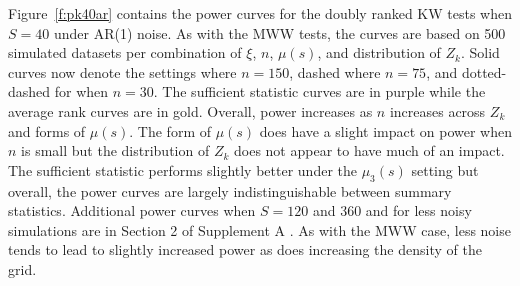 \documentclass[12pt]{article}
\theoremstyle{plain}
\theoremstyle{remark}
\begin{document}
Figure~\ref{f:pk40ar} contains the power curves for the doubly ranked KW tests when $S = 40$ under AR(1) noise. As with the MWW tests, the curves are based on 500 simulated datasets per combination of $\xi$, $n$, $\mu(s)$, and distribution of $Z_k$. Solid curves now denote the settings where $n = 150$, dashed where $n = 75$, and dotted-dashed for when $n = 30$. The sufficient statistic curves are in purple while the average rank curves are in gold. Overall, power increases as $n$ increases across $Z_k$ and forms of $\mu(s)$. The form of $\mu(s)$ does have a slight impact on power when $n$ is small but the distribution of $Z_k$ does not appear to have much of an impact. The sufficient statistic performs slightly better under the $\mu_3(s)$ setting but overall, the power curves are largely indistinguishable between summary statistics. Additional power curves when $S = 120$ and 360 and for less noisy simulations are in Section 2 of Supplement A \citep{DRTSup2024A}. As with the MWW case, less noise tends to lead to slightly increased power as does increasing the density of the grid.

\end{document}
